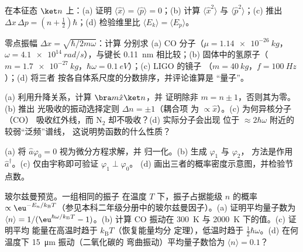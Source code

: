 \begin{exercise}[$\star$]\label{exo:b3:harmonic-oscillator:2}
在本征态 $\ket n$ 上：(a) 证明 $\langle\hat x\rangle =
\langle\hat p\rangle = 0$；(b) 计算 $\langle\hat x^2\rangle$ 与
$\langle\hat p^2\rangle$；(c) 推出 $\Delta x\,\Delta p = (n +
\tfrac12)\hbar$；(d) 检验维里比 $\langle E_k\rangle =
\langle E_p\rangle$。
\end{exercise}

\begin{exercise}[$\star$]\label{exo:b3:harmonic-oscillator:3}
零点振幅 $\Delta x = \sqrt{\hbar/2m\omega}$：计算
分别求 (a) CO 分子（$\mu = \qty{1.14e-26}{kg}$，$\omega =
\qty{4.1e14}{rad/s}$），与键长
\qty{0.11}{nm} 相比较；(b) 固体中的氢原子（$m =
\qty{1.7e-27}{kg}$，$\hbar\omega = \qty{0.1}{eV}$）；(c) LIGO 的镜子
（$m = \qty{40}{kg}$，$f = \qty{100}{Hz}$）；(d) 将三者
按各自体系尺度的分数排序，并评论谁算是
“量子”。
\end{exercise}

\begin{exercise}[$\star$]\label{exo:b3:harmonic-oscillator:4}
(a) 利用升降关系，计算 $\bra m\hat x\ket n$，并
证明除非 $m = n \pm 1$，否则其为零。(b) 推出
光吸收的振动选择定则 $\Delta n = \pm1$（耦合项
为 $\propto\hat x$）。(c) 为何异核分子（CO）
吸收红外线，而 N$_2$ 却不吸收？(d) 实际分子会出现
位于 $\approx 2\hbar\omega$ 附近的较弱“泛频”谱线，
这说明势函数的什么性质？
\end{exercise}

\begin{exercise}[$\star\star$]\label{exo:b3:harmonic-oscillator:5}
(a) 将 $\hat a\varphi_0 = 0$ 视为微分方程求解，并
归一化。(b) 生成 $\varphi_1$ 与 $\varphi_2$，
方法是作用 $\hat a^\dagger$。(c) 仅由宇称即可验证 $\varphi_1 \perp \varphi_0$。
(d) 画出三者的概率密度示意图，并检验节点数。
\end{exercise}

\begin{exercise}[$\star\star$]\label{exo:b3:harmonic-oscillator:6}
玻尔兹曼预览。一组相同的振子
在温度 $T$ 下，振子占据能级 $n$ 的概率 $\propto
\eu^{-E_n/k_{\text{B}}T}$（参见本科二年级分册中的玻尔兹曼因子）。(a)
证明平均量子数为 $\langle n\rangle =
1/(\eu^{\hbar\omega/k_{\text{B}}T} - 1)$。(b) 计算 CO 振动在
\qty{300}{K} 与 \qty{2000}{K} 下的值。(c) 证明平均
能量在高温时趋于 $k_{\text{B}}T$（恢复能量均分
定理），低温时趋于 $\tfrac12\hbar\omega$。(d) 在何温度下
\qty{15}{\micro m} 振动（二氧化碳的
弯曲振动）平均量子数恰为 $\langle n\rangle = 0.1$？
\end{exercise}

